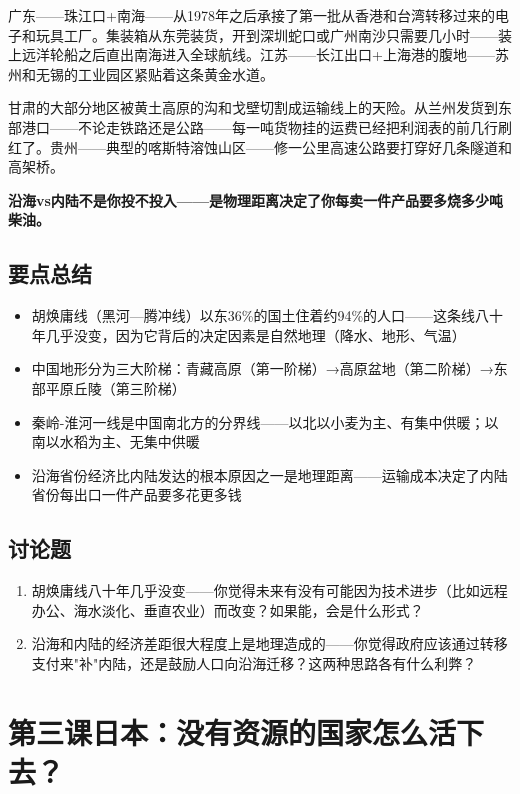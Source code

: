 \documentclass[a4paper,12pt]{ctexart}
\begin{document}
广东——珠江口+南海——从1978年之后承接了第一批从香港和台湾转移过来的电子和玩具工厂。集装箱从东莞装货，开到深圳蛇口或广州南沙只需要几小时——装上远洋轮船之后直出南海进入全球航线。江苏——长江出口+上海港的腹地——苏州和无锡的工业园区紧贴着这条黄金水道。

甘肃的大部分地区被黄土高原的沟和戈壁切割成运输线上的天险。从兰州发货到东部港口——不论走铁路还是公路——每一吨货物挂的运费已经把利润表的前几行刷红了。贵州——典型的喀斯特溶蚀山区——修一公里高速公路要打穿好几条隧道和高架桥。

\textbf{沿海vs内陆不是你投不投入——是物理距离决定了你每卖一件产品要多烧多少吨柴油。}

\subsection*{要点总结}
\begin{itemize}
  \item 胡焕庸线（黑河—腾冲线）以东36\%的国土住着约94\%的人口——这条线八十年几乎没变，因为它背后的决定因素是自然地理（降水、地形、气温）
  \item 中国地形分为三大阶梯：青藏高原（第一阶梯）→高原盆地（第二阶梯）→东部平原丘陵（第三阶梯）
  \item 秦岭-淮河一线是中国南北方的分界线——以北以小麦为主、有集中供暖；以南以水稻为主、无集中供暖
  \item 沿海省份经济比内陆发达的根本原因之一是地理距离——运输成本决定了内陆省份每出口一件产品要多花更多钱
\end{itemize}

\subsection*{讨论题}
\begin{enumerate}
  \item 胡焕庸线八十年几乎没变——你觉得未来有没有可能因为技术进步（比如远程办公、海水淡化、垂直农业）而改变？如果能，会是什么形式？
  \item 沿海和内陆的经济差距很大程度上是地理造成的——你觉得政府应该通过转移支付来"补"内陆，还是鼓励人口向沿海迁移？这两种思路各有什么利弊？
\end{enumerate}

\newpage

\section{\textcolor{orange!80!black}{第三课\quad 日本：没有资源的国家怎么活下去？}}
\end{document}
